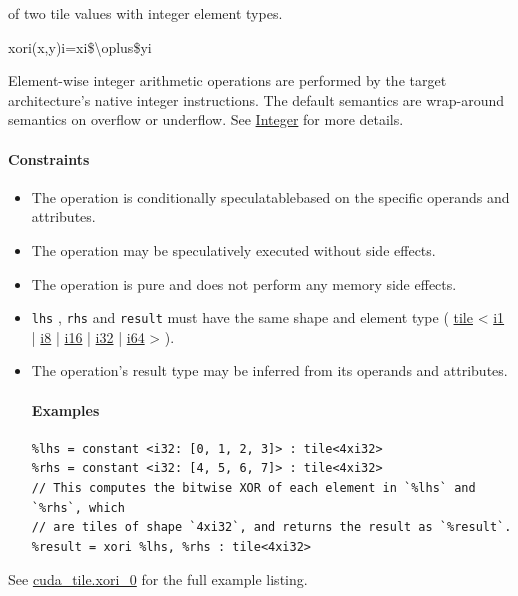 \documentclass{article}
\begin{document}
of two tile values with integer element types.


xori(x,y)i=xi\$\textbackslash{}oplus\$yi

Element-wise integer arithmetic operations are performed by the target architecture's native integer instructions. The default semantics are wrap-around semantics on overflow or underflow. See \href{https://docs.nvidia.com/cuda/tile-ir/latest/sections/operations.html#op-group-integer}{Integer} for more details.



\paragraph{Constraints}

\begin{itemize}
\item The operation is conditionally speculatablebased on the specific operands and attributes.
\item The operation may be speculatively executed without side effects.
\item The operation is pure and does not perform any memory side effects.
\item \texttt{lhs} , \texttt{rhs} and \texttt{result} must have the same shape and element type ( \href{https://docs.nvidia.com/cuda/tile-ir/latest/sections/types.html#type-tile}{tile} < \href{https://docs.nvidia.com/cuda/tile-ir/latest/sections/types.html#subsection-element-types}{i1} | \href{https://docs.nvidia.com/cuda/tile-ir/latest/sections/types.html#subsection-element-types}{i8} | \href{https://docs.nvidia.com/cuda/tile-ir/latest/sections/types.html#subsection-element-types}{i16} | \href{https://docs.nvidia.com/cuda/tile-ir/latest/sections/types.html#subsection-element-types}{i32} | \href{https://docs.nvidia.com/cuda/tile-ir/latest/sections/types.html#subsection-element-types}{i64} > ).
\item The operation's result type may be inferred from its operands and attributes.


\paragraph{Examples}

\begin{lstlisting}
%lhs = constant <i32: [0, 1, 2, 3]> : tile<4xi32>
%rhs = constant <i32: [4, 5, 6, 7]> : tile<4xi32>
// This computes the bitwise XOR of each element in `%lhs` and `%rhs`, which
// are tiles of shape `4xi32`, and returns the result as `%result`.
%result = xori %lhs, %rhs : tile<4xi32>
\end{lstlisting}

\end{itemize}
See \href{https://docs.nvidia.com/cuda/tile-ir/latest/sections/appendix.html#example-cuda-tile-xori-0}{cuda\_tile.xori\_0} for the full example listing.
\end{document}
